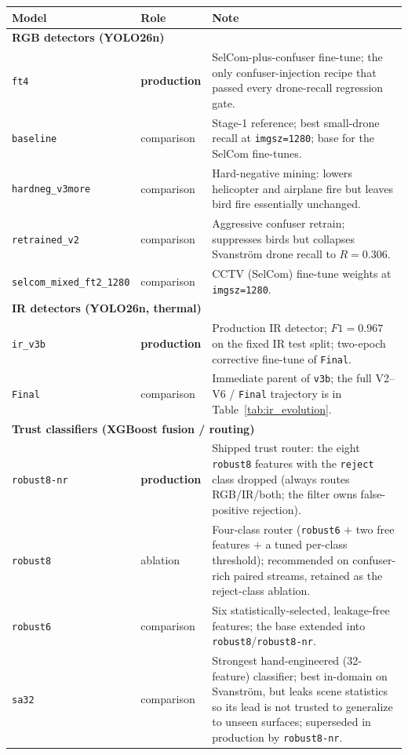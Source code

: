 \footnotesize
\begin{longtable}{p{}lp{}}
\toprule
Model & Role & Note \\
\midrule
\endhead
\multicolumn{3}{l}{\textbf{RGB detectors (YOLO26n)}} \\
\midrule
\texttt{ft4} & \textbf{production} & SelCom-plus-confuser fine-tune; the only confuser-injection recipe that passed every drone-recall regression gate. \\
\texttt{baseline} & comparison & Stage-1 reference; best small-drone recall at \texttt{imgsz=1280}; base for the SelCom fine-tunes. \\
\texttt{hardneg\_v3more} & comparison & Hard-negative mining: lowers helicopter and airplane fire but leaves bird fire essentially unchanged. \\
\texttt{retrained\_v2} & comparison & Aggressive confuser retrain; suppresses birds but collapses Svanstr\"om drone recall to $R=0.306$. \\
\texttt{selcom\_mixed\_ft2\_1280} & comparison & CCTV (SelCom) fine-tune weights at \texttt{imgsz=1280}. \\
\midrule
\multicolumn{3}{l}{\textbf{IR detectors (YOLO26n, thermal)}} \\
\midrule
\texttt{ir\_v3b} & \textbf{production} & Production IR detector; $F1=0.967$ on the fixed IR test split; two-epoch corrective fine-tune of \texttt{Final}. \\
\texttt{Final} & comparison & Immediate parent of \texttt{v3b}; the full V2--V6 / \texttt{Final} trajectory is in Table~\ref{tab:ir_evolution}. \\
\midrule
\multicolumn{3}{l}{\textbf{Trust classifiers (XGBoost fusion / routing)}} \\
\midrule
\texttt{robust8-nr} & \textbf{production} & Shipped trust router: the eight \texttt{robust8} features with the \texttt{reject} class dropped (always routes RGB/IR/both; the filter owns false-positive rejection). \\
\texttt{robust8} & ablation & Four-class router (\texttt{robust6} $+$ two free features $+$ a tuned per-class threshold); recommended on confuser-rich paired streams, retained as the reject-class ablation. \\
\texttt{robust6} & comparison & Six statistically-selected, leakage-free features; the base extended into \texttt{robust8}/\texttt{robust8-nr}. \\
\texttt{sa32} & comparison & Strongest hand-engineered (32-feature) classifier; best in-domain on Svanstr\"om, but leaks scene statistics so its lead is not trusted to generalize to unseen surfaces; superseded in production by \texttt{robust8-nr}. \\

\end{longtable}
